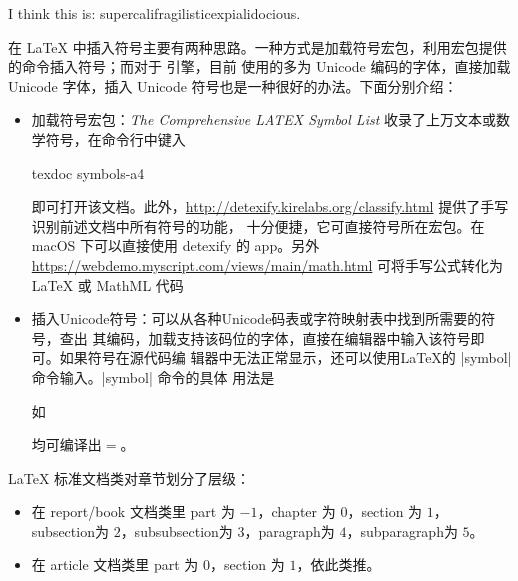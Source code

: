 \begin{texinlist}
I think this is: su\-per\-cal\-i\-frag\-i\-lis\-tic\-ex\-pi\-al\-i\-do\-cious.
\end{texinlist}


在 \LaTeX{} 中插入符号主要有两种思路。一种方式是加载符号宏包，利用宏包提供的命令插入符号；而对于 \XeTeX{} 引擎，目前
使用的多为 Unicode 编码的字体，直接加载 Unicode 字体，插入 Unicode 符号也是一种很好的办法。下面分别介绍：
\begin{itemize}
\item
  加载符号宏包：\emph{The Comprehensive LATEX Symbol List} 收录了上万文本或数学符号，在命令行中键入
  \begin{shcode}
    texdoc symbols-a4
  \end{shcode}
  即可打开该文档。此外，\url{http://detexify.kirelabs.org/classify.html} 提供了手写识别前述文档中所有符号的功能，
  十分便捷，它可直接符号所在宏包。在 macOS 下可以直接使用 detexify 的 app。另外
  \url{https://webdemo.myscript.com/views/main/math.html} 可将手写公式转化为 \LaTeX{} 或 MathML 代码

\item 插入Unicode符号：可以从各种Unicode码表或字符映射表中找到所需要的符号，查出
  其编码，加载支持该码位的字体，直接在编辑器中输入该符号即可。如果符号在源代码编
  辑器中无法正常显示，还可以使用\LaTeX{}的 |symbol| 命令输入。|symbol| 命令的具体
  用法是
  \begin{texlist}
  \end{texlist}
如
均可编译出\( = \)。
\end{itemize}




\LaTeX{} 标准文档类对章节划分了层级：
\begin{itemize}
\item 在 report/book 文档类里 part 为 $-1$，chapter 为 $0$，section 为 $1$，
  subsection为 $2$，subsubsection为 $3$，paragraph为 $4$，subparagraph为 $5$。
\item 在 article 文档类里 part 为 $0$，section 为 $1$，依此类推。
\end{itemize}

